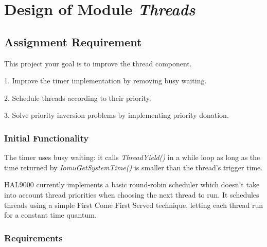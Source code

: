 
\chapter{Design of Module \textit{Threads}}


\section{Assignment Requirement}
	\item This project your goal is to improve the thread component.
	\item 1. Improve the timer implementation by removing busy waiting.
	\item 2. Schedule threads according to their priority.
	\item 3. Solve priority inversion problems by implementing priority donation.

\subsection{Initial Functionality}
	\item The timer uses busy waiting: it calls \textit{ThreadYield()} in a while loop as long as the time returned by \textit{IomuGetSystemTime()} is smaller than
		  the thread's trigger time.
	\item HAL9000 currently implements a basic round-robin scheduler which doesn't take into account thread priorities when choosing the next thread to run.
		  It schedules threads using a simple First Come First Served technique, letting each thread run for a constant time quantum.

\subsection{Requirements}

